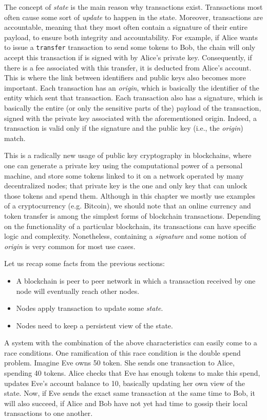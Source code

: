 The concept of \textit{state} is the main reason why transactions exist. Transactions most often
cause some sort of \textit{update} to happen in the state. Moreover, transactions are accountable,
meaning that they most often contain a signature of their entire payload, to ensure both integrity
and accountability. For example, if Alice wants to issue a \texttt{transfer} transaction to send
some tokens to Bob, the chain will only accept this transaction if is signed with by Alice's private
key. Consequently, if there is a fee associated with this transfer, it is deducted from Alice's
account. This is where the link between identifiers and public keys also becomes more important.
Each transaction has an \textit{origin}, which is basically the identifier of the entity which sent
that transaction. Each transaction also has a signature, which is basically the entire (or only the
sensitive parts of the) payload of the transaction, signed with the private key associated with the
aforementioned origin. Indeed, a transaction is valid only if the signature and the public key
(i.e., the \textit{origin}) match.

This is a radically new usage of public key cryptography in blockchains, where one can generate a
private key using the computational power of a personal machine, and store some tokens linked to it
on a network operated by many decentralized nodes; that private key is the one and only key that can
unlock those tokens and spend them. Although in this chapter we mostly use examples of a
cryptocurrency (e.g. Bitcoin), we should note that an online currency and token transfer is among
the simplest forms of blockchain transactions. Depending on the functionality of a particular
blockchain, its transactions can have specific logic and complexity. Nonetheless, containing a
\textit{signature} and some notion of \textit{origin} is very common for most use cases.

Let us recap some facts from the previous sections:

\begin{itemize}
	\item A blockchain is peer to peer network in which a transaction received by one node will
	eventually reach other nodes.
	\item Nodes apply transaction to update some \textit{state}.
	\item Nodes need to keep a persistent view of the state.
\end{itemize}

A system with the combination of the above characteristics can easily come to a race conditions. One ramification of this race condition is the double spend problem.
Imagine Eve owns 50 token. She sends one transaction to Alice, spending 40 tokens. Alice checks that
Eve has enough tokens to make this spend, updates Eve's account balance to 10, basically updating her
own view of the state. Now, if Eve sends the exact same transaction at the same time to Bob, it will also
succeed, if Alice and Bob have not yet had time to gossip their local transactions to one another.

